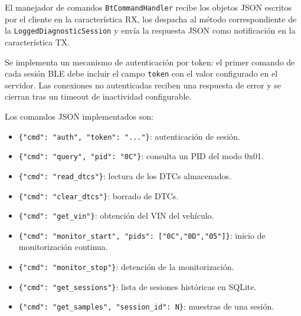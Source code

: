 El manejador de comandos \texttt{BtCommandHandler} recibe los objetos JSON escritos por el cliente en la característica RX, los despacha al método correspondiente de la \texttt{LoggedDiagnosticSession} y envía la respuesta JSON como notificación en la característica TX.

Se implementa un mecanismo de autenticación por token: el primer comando de cada sesión BLE debe incluir el campo \texttt{token} con el valor configurado en el servidor. Las conexiones no autenticadas reciben una respuesta de error y se cierran tras un timeout de inactividad configurable.

Los comandos JSON implementados son:

\begin{itemize}
    \item \verb|{"cmd": "auth", "token": "..."}|: autenticación de sesión.
    \item \verb|{"cmd": "query", "pid": "0C"}|: consulta un PID del modo 0x01.
    \item \verb|{"cmd": "read_dtcs"}|: lectura de los DTCs almacenados.
    \item \verb|{"cmd": "clear_dtcs"}|: borrado de DTCs.
    \item \verb|{"cmd": "get_vin"}|: obtención del VIN del vehículo.
    \item \verb|{"cmd": "monitor_start", "pids": ["0C","0D","05"]}|: inicio de monitorización continua.
    \item \verb|{"cmd": "monitor_stop"}|: detención de la monitorización.
    \item \verb|{"cmd": "get_sessions"}|: lista de sesiones históricas en SQLite.
    \item \verb|{"cmd": "get_samples", "session_id": N}|: muestras de una sesión.
\end{itemize}
